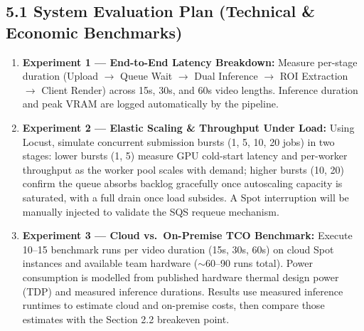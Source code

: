 \documentclass[10pt,a4paper]{article}
\begin{document}
\subsection*{\textsf{5.1 System Evaluation Plan (Technical \& Economic Benchmarks)}}
\begin{enumerate}
    \item \textbf{Experiment 1 --- End-to-End Latency Breakdown:} Measure per-stage duration (Upload $\rightarrow$ Queue Wait $\rightarrow$ Dual Inference $\rightarrow$ ROI Extraction $\rightarrow$ Client Render) across 15s, 30s, and 60s video lengths. Inference duration and peak VRAM are logged automatically by the pipeline.
    \item \textbf{Experiment 2 --- Elastic Scaling \& Throughput Under Load:} Using Locust, simulate concurrent submission bursts (1, 5, 10, 20 jobs) in two stages: lower bursts (1, 5) measure GPU cold-start latency and per-worker throughput as the worker pool scales with demand; higher bursts (10, 20) confirm the queue absorbs backlog gracefully once autoscaling capacity is saturated, with a full drain once load subsides. A Spot interruption will be manually injected to validate the SQS requeue mechanism.
    \item \textbf{Experiment 3 --- Cloud vs.\ On-Premise TCO Benchmark:} Execute 10--15 benchmark runs per video duration (15s, 30s, 60s) on cloud Spot instances and available team hardware ($\sim$60--90 runs total). Power consumption is modelled from published hardware thermal design power (TDP) and measured inference durations. Results use measured inference runtimes to estimate cloud and on-premise costs, then compare those estimates with the Section 2.2 breakeven point.
\end{enumerate}
\end{document}
